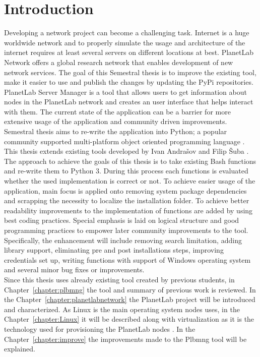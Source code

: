\chapter*{Introduction}
{}

Developing a network project can become a challenging task. Internet is a huge worldwide network and to properly simulate the usage and architecture of the internet requires at least several servers on different locations at best. PlanetLab Network offers a global research network that enables development of new network services. The goal of this Semestral thesis is to improve the existing tool, make it easier to use and publish the changes by updating the PyPi repositories. PlanetLab Server Manager is a tool that allows users to get information about nodes in the PlanetLab network and creates an user interface that helps interact with them. The current state of the application can be a barrier for more extensive usage of the application and community driven improvements. Semestral thesis aims to re-write the application into Python; a popular community supported multi-platform object oriented programming language \cite{lutz2013learning}. This thesis extends existing tools developed by Ivan Andrašov \cite{andrasov2} and Filip Šuba \cite{suba1}.\\
The approach to achieve the goals of this thesis is to take existing Bash functions and re-write them to Python 3. During this process each functions is evaluated whether the used implementation is correct or not. To achieve easier usage of the application, main focus is applied onto removing system package dependencies and scrapping the necessity to localize the installation folder. To achieve better readability improvements to the implementation of functions are added by using best coding practices. Special emphasis is laid on logical structure and good programming practices to empower later community improvements to the tool. Specifically, the enhancement will include removing search limitation, adding library support, eliminating pre and post installations steps, improving credentials set up, writing functions with support of Windows operating system and several minor bug fixes or improvements.\\
Since this thesis uses already existing tool created by previous students, in Chapter~\ref{chapter:plbmng} the tool and summary of previous work is reviewed. In the Chapter~\ref{chapter:planetlabnetwork} the PlanetLab project will be introduced and characterized. As Linux is the main operating system nodes uses, in the Chapter~\ref{chapter:Linux} it will be described along with virtualization as it is the technology used for provisioning the PlanetLab nodes \cite{planetlababout}. In the Chapter~\ref{chapter:improve} the improvements made to the Plbmng tool will be explained.